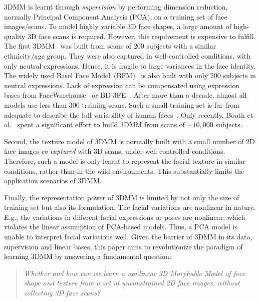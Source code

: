3DMM is learnt through {\it supervision} by performing dimension reduction, normally Principal Component
Analysis (PCA), on a training set of face images/scans. 
To model highly variable 3D face shapes, a large amount of high-quality 3D face scans is required. 
However, this requirement is expensive to fulfill. 
The first 3DMM~\cite{blanz1999morphable} was built from scans of $200$ subjects with a similar ethnicity/age group. 
They were also captured in well-controlled conditions, with only neutral expressions. 
Hence, it is fragile to large variances in the face identity. 
The widely used Basel Face Model~(BFM)~\cite{paysan20093d} is also built with only $200$ subjects in neutral expressions.  
Lack of expression can be compensated using expression bases from FaceWarehouse~\cite{cao2014facewarehouse} or BD-3FE~\cite{yin20063d}. 
After more than a decade, almost all models use less than $300$ training scans. 
Such a small training set is far from adequate to describe the full variability of human faces~\cite{booth20163d}. 
Only recently, Booth et al.~\cite{booth20163d} spent a significant effort to build 3DMM from scans of ${\sim}10,000$ subjects. %

Second, the texture model of 3DMM is normally built with a small number of 2D face images {\it co-captured} with 3D scans, under well-controlled conditions.
Therefore, such a model is only learnt to represent the facial texture in similar conditions, rather than in-the-wild environments.
This substantially limits the application scenarios of 3DMM.

Finally, the representation power of 3DMM is limited by not only the size of training set but also its formulation. 
The facial variations are nonlinear in nature. 
E.g., the variations in different facial expressions or poses are nonlinear, which violates the linear assumption of PCA-based models. 
Thus, a PCA model is unable to interpret facial variations well.
Given the barrier of 3DMM in its data, supervision and linear bases, this paper aims to revolutionize the paradigm of learning 3DMM by answering a fundamental question:

\begin{quote}
{\it Whether and how can we learn a nonlinear 3D Morphable Model of face shape and texture from a set of unconstrained 2D face images, without collecting 3D face scans?}
\end{quote}

